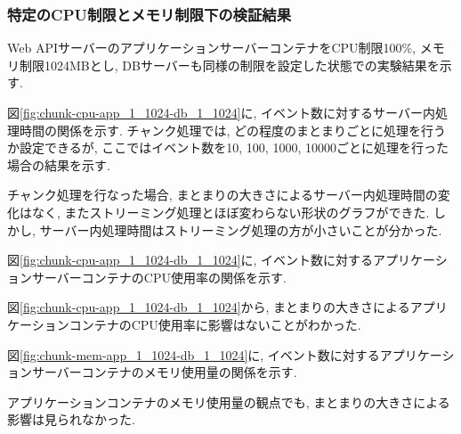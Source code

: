 \documentclass[../../../../main]{subfiles}
\begin{document}
    \subsubsection{特定のCPU制限とメモリ制限下の検証結果}\label{subsubsec:result-chunk-only-limit}

    Web APIサーバーのアプリケーションサーバーコンテナをCPU制限100\%, メモリ制限1024MBとし, DBサーバーも同様の制限を設定した状態での実験結果を示す.

    \label{subsubsubsec:result-chunk-only-limit-server-time}

    図\ref{fig:chunk-cpu-app_1_1024-db_1_1024}に, イベント数に対するサーバー内処理時間の関係を示す. チャンク処理では, どの程度のまとまりごとに処理を行うか設定できるが, ここではイベント数を10, 100, 1000, 10000ごとに処理を行った場合の結果を示す.

    

    チャンク処理を行なった場合, まとまりの大きさによるサーバー内処理時間の変化はなく, またストリーミング処理とほぼ変わらない形状のグラフができた. しかし, サーバー内処理時間はストリーミング処理の方が小さいことが分かった.

    \label{subsubsubsec:result-chunk-only-limit-server-cpu}

    図\ref{fig:chunk-cpu-app_1_1024-db_1_1024}に, イベント数に対するアプリケーションサーバーコンテナのCPU使用率の関係を示す.

    

    図\ref{fig:chunk-cpu-app_1_1024-db_1_1024}から, まとまりの大きさによるアプリケーションコンテナのCPU使用率に影響はないことがわかった.

    \label{subsubsubsec:result-chunk-only-limit-server-memory}

    図\ref{fig:chunk-mem-app_1_1024-db_1_1024}に, イベント数に対するアプリケーションサーバーコンテナのメモリ使用量の関係を示す.

    

    アプリケーションコンテナのメモリ使用量の観点でも, まとまりの大きさによる影響は見られなかった.
\end{document}
